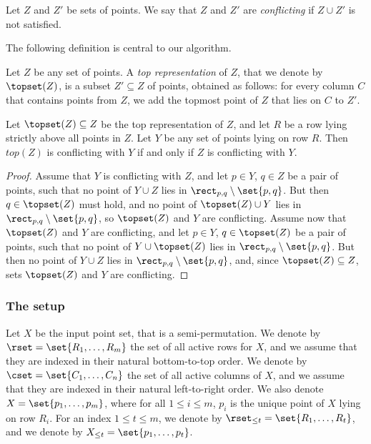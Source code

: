 \begin{definition}  
Let $Z$ and $Z'$ be sets of points. 
We say that $Z$ and $Z'$ are \emph{conflicting} if $Z \cup Z'$ is not satisfied. 
%
\end{definition} 



%
%

%
%
%
%
%


The following definition is central to our algorithm.

\begin{definition}  
Let $Z$ be any set of points.
A \emph{top representation} of $Z$, that we denote by $\topset(Z)$, is a subset $Z' \subseteq Z$ of points, obtained as follows: for every column $C$ that contains points from $Z$, we add the topmost point of $Z$ that lies on $C$ to $Z'$.
\end{definition} 

\begin{myobs} 
\label{obs:top points sufficient} 
Let $\topset(Z) \subseteq Z$ be the top representation of $Z$, and let $R$ be a row lying strictly above all points in $Z$. Let $Y$ be any set of points lying on row $R$. Then $top(Z)$ is conflicting with $Y$ if and only if $Z$ is conflicting with $Y$.  
\end{myobs} 
\begin{proof}
	Assume that $Y$ is conflicting with $Z$, and let $p\in Y$, $q\in Z$ be a pair of points, such that no point of $Y\cup Z$ lies in $\rect_{p,q}\setminus\set{p,q}$. But then $q\in \topset(Z)$ must hold, and no point of $\topset(Z)\cup Y$ lies in $\rect_{p,q}\setminus\set{p,q}$, so $\topset(Z)$ and $Y$ are conflicting.
	Assume now that $\topset(Z)$ and $Y$ are conflicting, and let $p\in Y$, $q\in \topset(Z)$ be a pair of points, such that no point of $Y\cup \topset(Z)$ lies in $\rect_{p,q}\setminus\set{p,q}$. But then no point of $Y\cup Z$ lies in $\rect_{p,q}\setminus\set{p,q}$, and, since $\topset(Z)\subseteq Z$, sets $\topset(Z)$ and $Y$ are conflicting.
\end{proof}




%



\subsubsection{The setup} 

Let $X$ be the input point set, that is a semi-permutation.
We denote by $\rset=\set{R_1,\ldots,R_m}$ the set of all active rows for $X$, and we assume that they are indexed in their natural bottom-to-top order. We denote by $\cset=\set{C_1,\ldots,C_n}$ the set of all active columns of $X$, and we assume that they are indexed in their natural left-to-right order. We also denote $X=\set{p_1,\ldots,p_m}$, where for all $1\leq i\leq m$, $p_i$ is the unique point of $X$ lying on row $R_i$.
For an index $1\leq t\leq m$, we denote by $\rset_{\leq t}=\set{R_1,\ldots,R_t}$, and we denote by $X_{\leq t}=\set{p_1,\ldots,p_t}$.

